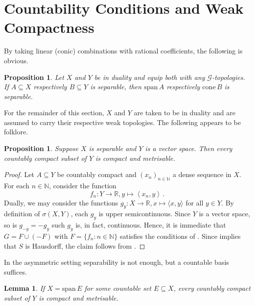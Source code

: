 \documentclass[
	paper=A4,
	pagesize=auto,
	fontsize=12pt
]{scrartcl}
\theoremstyle{plain}
\newtheorem{proposition}[theorem]{Proposition}
\newtheorem{lemma}[theorem]{Lemma}
\theoremstyle{remark}
\theoremstyle{definition}
\begin{document}
\section{Countability Conditions and Weak Compactness}
\label{sec:WeakCompactnessAndCountability}
%
By taking linear (conic) combinations with rational coefficients, the following is obvious.
%
\begin{proposition}
Let $X$ and $Y$ be in duality and equip both with any $\mathcal{G}$-topologies.
If $A \subseteq X$ respectively $B \subseteq Y$ is separable, then $\mathrm{span}\, A$ respectively $\mathrm{cone}\, B$ is separable.
\end{proposition}
%
For the remainder of this section, $X$ and $Y$ are taken to be in duality and are assumed to carry their respective weak topologies.
The following  appears to be folklore.
%
\begin{proposition}
\label{prop:VectorDualitySeparableVersusCountablyCompact}
Suppose $X$ is separable and $Y$ is a vector space.
Then every countably compact subset of $Y$ is compact and metrisable.
\end{proposition}
\begin{proof}
Let $A \subseteq Y$ be countably compact and $(x_n)_{n \in \mathbb{N}}$ a dense sequence in $X$.
For each $n \in \mathbb{N}$, consider the function
%
\begin{equation}
f_n : Y \to \mathbb{R}, y \mapsto \left< x_n, y \right> \, .
\end{equation}
%
Dually, we may consider the functions $g_y : X \to \mathbb{R}, x \mapsto \langle x, y \rangle$ for all $y \in Y$.
By definition of $\sigma(X, Y)$, each $g_y$ is upper semicontinuous.
Since $Y$ is a vector space, so is $g_{-y} = - g_y$ such $g_y$ is, in fact, continuous.
Hence, it is immediate that $G = F \cup (-F)$ with $F = \{ f_n : n \in \mathbb{N} \}$ satisfies the conditions of .
Since  implies that $S$ is Hausdorff, the claim follows from \cite[Theorem 3.1.19]{src:Engelking:GeneralTopology}.
\end{proof}
%
In the asymmetric setting separability is not enough, but a countable basis suffices.
%
\begin{lemma}
\label{lem:CountableBasisImpliesMetrisableCompactaInDual}
If $X = \mathrm{span}\, E$ for some countable set $E \subseteq X$, every countably compact subset of $Y$ is compact and metrisable.
\end{lemma}
\end{document}
